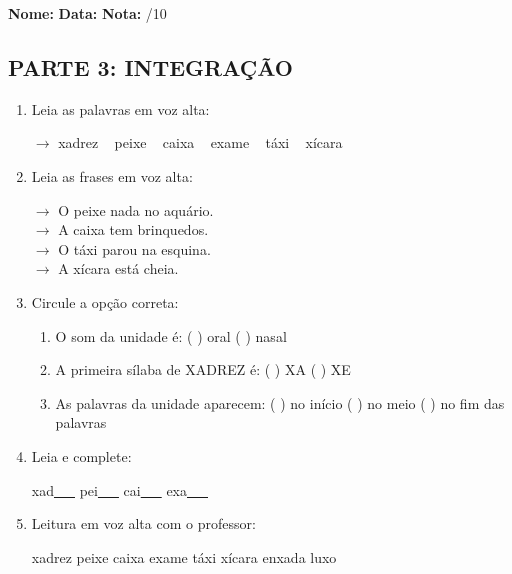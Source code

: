 \begin{exercicio}

\noindent\textbf{Nome:} \underline{\hspace{3.2cm}} \quad \textbf{Data:} \underline{\hspace{1.6cm}} \quad \textbf{Nota:} \underline{\hspace{0.9cm}}/10


\subsection*{PARTE 3: INTEGRAÇÃO}

\begin{enumerate}[resume]

  \item Leia as palavras em voz alta:
  \begin{center}
  $\rightarrow$ xadrez ~ peixe ~ caixa ~ exame ~ táxi ~ xícara
  \end{center}

  \item Leia as frases em voz alta:
  \begin{center}
  $\rightarrow$ O peixe nada no aquário.\\
  $\rightarrow$ A caixa tem brinquedos.\\
  $\rightarrow$ O táxi parou na esquina.\\
  $\rightarrow$ A xícara está cheia.\\
  \end{center}

  \item Circule a opção correta:
  \begin{enumerate}[label=(\alph*)]

    \item O som da unidade é: ( ) oral ( ) nasal 

    \item A primeira sílaba de XADREZ é: ( ) XA ( ) XE

    \item As palavras da unidade aparecem: ( ) no início ( ) no meio ( ) no fim das palavras

  \end{enumerate}

  \item Leia e complete:
  \begin{center}
  xad\underline{~~~} \quad pei\underline{~~~} \quad cai\underline{~~~} \quad exa\underline{~~~}
  \end{center}

  \item Leitura em voz alta com o professor:
  \begin{center}
  xadrez \quad peixe \quad caixa \quad exame \quad táxi \quad xícara \quad enxada \quad luxo
  \end{center}

\end{enumerate}

\end{exercicio}

